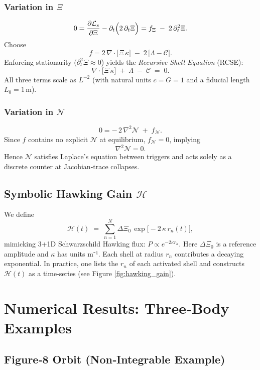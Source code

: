 \documentclass[11pt]{article}
\newcommand{\Contradiction}{\Xi}
\newcommand{\Coherence}{\mathcal{C}}
\newcommand{\Noetic}{\mathcal{N}}
\newcommand{\Leak}{\Lambda}
\newcommand{\Curv}{\kappa}
\newcommand{\Lag}{\mathcal{L}_s}
\newcommand{\Hgain}{\mathcal{H}}
\begin{document}
\subsubsection{Variation in \(\Contradiction\)}
\[
  0 
  = \frac{\partial \Lag}{\partial \Contradiction}
  - \partial_{t}\Bigl(2\,\partial_{t}\Contradiction\Bigr)
  = f_{\Contradiction} \;-\; 2\,\partial_{t}^{2}\Contradiction.
\]
Choose
\[
  f 
  = 2\,\nabla\!\cdot\bigl[\Contradiction\,\Curv\bigr]
  \;-\;2\,\bigl[\Leak - \Coherence\bigr].
\]
Enforcing stationarity (\(\partial_{t}^{2}\Contradiction \approx 0\)) yields the \emph{Recursive Shell Equation} (RCSE):
\begin{equation}\label{eq:RCSE}
  \nabla\!\cdot\!\bigl[\Contradiction\,\Curv\bigr]
  \;+\;\Leak \;-\;\Coherence
  \;=\;0.
\end{equation}
All three terms scale as \(L^{-2}\) (with natural units \(c=G=1\) and a fiducial length \(L_0 = 1\,\mathrm{m}\)).

\subsubsection{Variation in \(\Noetic\)}
\[
  0 
  = -\,2\,\nabla^{2}\Noetic \;+\; f_{\Noetic}.
\]
Since \(f\) contains no explicit \(\Noetic\) at equilibrium, \(f_{\Noetic} = 0\), implying
\[
  \nabla^{2}\Noetic = 0.
\]
Hence \(\Noetic\) satisfies Laplace’s equation between triggers and acts solely as a discrete counter at Jacobian‐trace collapses.

\subsection{Symbolic Hawking Gain \(\Hgain\)}
We define
\[
  \Hgain(t) \;=\; \sum_{n=1}^N \Delta\Contradiction_{0}\,\exp\bigl[-2\,\Curv\,r_{n}(t)\bigr],
\]
mimicking 3+1D Schwarzschild Hawking flux: \(P \propto e^{-2\kappa r_h}\). Here \(\Delta\Contradiction_0\) is a reference amplitude and \(\Curv\) has units m⁻¹. Each shell at radius \(r_n\) contributes a decaying exponential. In practice, one lists the \(r_n\) of each activated shell and constructs \(\Hgain(t)\) as a time‐series (see Figure \ref{fig:hawking_gain}).

\section{Numerical Results: Three‐Body Examples}

\subsection{Figure‐8 Orbit (Non‐Integrable Example)}\label{sec:fig8_example}
\end{document}
